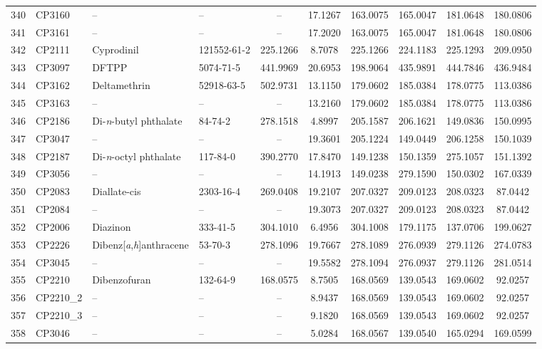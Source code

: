 \begin{longtable}{clllcccccc}
340 & CP3160 & – & – & – & 17.1267 & 163.0075 & 165.0047 & 181.0648 & 180.0806 \\ 
341 & CP3161 & – & – & – & 17.2020 & 163.0075 & 165.0047 & 181.0648 & 180.0806 \\ 
342 & CP2111 & Cyprodinil & 121552-61-2 & 225.1266 & 8.7078 & 225.1266 & 224.1183 & 225.1293 & 209.0950 \\ 
343 & CP3097 & DFTPP & 5074-71-5 & 441.9969 & 20.6953 & 198.9064 & 435.9891 & 444.7846 & 436.9484 \\ 
344 & CP3162 & Deltamethrin & 52918-63-5 & 502.9731 & 13.1150 & 179.0602 & 185.0384 & 178.0775 & 113.0386 \\ 
345 & CP3163 & – & – & – & 13.2160 & 179.0602 & 185.0384 & 178.0775 & 113.0386 \\ 
346 & CP2186 & Di-\textit{n}-butyl phthalate & 84-74-2 & 278.1518 & 4.8997 & 205.1587 & 206.1621 & 149.0836 & 150.0995 \\ 
347 & CP3047 & – & – & – & 19.3601 & 205.1224 & 149.0449 & 206.1258 & 150.1039 \\ 
348 & CP2187 & Di-\textit{n}-octyl phthalate\smash{\textsuperscript{\textdaggerdbl}} & 117-84-0 & 390.2770 & 17.8470 & 149.1238 & 150.1359 & 275.1057 & 151.1392 \\ 
349 & CP3056 & – & – & – & 14.1913 & 149.0238 & 279.1590 & 150.0302 & 167.0339 \\ 
350 & CP2083 & Diallate-cis & 2303-16-4 & 269.0408 & 19.2107 & 207.0327 & 209.0123 & 208.0323 & 87.0442 \\ 
351 & CP2084 & – & – & – & 19.3073 & 207.0327 & 209.0123 & 208.0323 & 87.0442 \\ 
352 & CP2006 & Diazinon & 333-41-5 & 304.1010 & 6.4956 & 304.1008 & 179.1175 & 137.0706 & 199.0627 \\ 
353 & CP2226 & Dibenz[\textit{a},\textit{h}]anthracene & 53-70-3 & 278.1096 & 19.7667 & 278.1089 & 276.0939 & 279.1126 & 274.0783 \\ 
354 & CP3045 & – & – & – & 19.5582 & 278.1094 & 276.0937 & 279.1126 & 281.0514 \\ 
355 & CP2210 & Dibenzofuran & 132-64-9 & 168.0575 & 8.7505 & 168.0569 & 139.0543 & 169.0602 & 92.0257 \\ 
356 & CP2210\_2 & – & – & – & 8.9437 & 168.0569 & 139.0543 & 169.0602 & 92.0257 \\ 
357 & CP2210\_3 & – & – & – & 9.1820 & 168.0569 & 139.0543 & 169.0602 & 92.0257 \\ 
358 & CP3046 & – & – & – & 5.0284 & 168.0567 & 139.0540 & 165.0294 & 169.0599 \\ 

\end{longtable}
